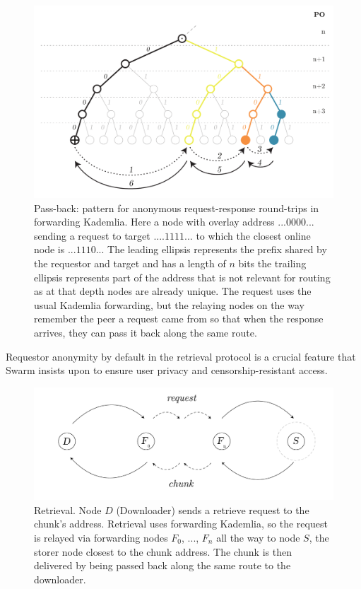 \begin{figure}[htbp]
   \centering
   \includegraphics[width=\textwidth]{fig/request-response-forwarding.pdf}
   \caption[Pass-back: a pattern for anonymous request-response round-trips in forwarding Kademlia \statusgreen]{Pass-back: pattern for anonymous request-response round-trips in forwarding Kademlia. Here a node with overlay address $...0000...$ sending a request to target $....1111...$ to which the closest online node is $...1110...$ The leading ellipsis represents the prefix shared by the requestor and target and has a length of $n$ bits the trailing ellipsis represents part of the address that is not relevant for routing as at that depth nodes are already unique. The request uses the usual Kademlia forwarding, but the relaying nodes on the way remember the peer a request came from so that when the response arrives, they can pass it back along the same route.}
   \label{fig:request-response}
\end{figure}

Requestor anonymity by default in the retrieval protocol is a crucial feature that Swarm insists upon to ensure user privacy and censorship-resistant access.

\begin{figure}[htbp]
   \centering
   \includegraphics[width=\textwidth]{fig/retrieval.pdf}
   \caption[Retrieval \statusgreen]{Retrieval. Node $D$ (Downloader) sends a retrieve request to the chunk's address. Retrieval uses forwarding Kademlia, so the request is relayed via forwarding nodes $F_0$, ..., $F_n$ all the way to node $S$, the storer node closest to the chunk address. The chunk is then delivered by being passed back along the same route to the downloader.}
   \label{fig:retrieval}
\end{figure}


